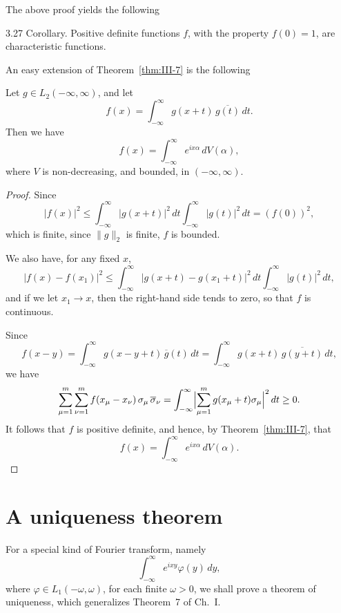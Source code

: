 The above proof yields the following

\begin{nstmt}{3.27}\label{eq:III-3.27}
Corollary. Positive definite functions $f$, with the property $f(0)=1$, are characteristic functions.
\end{nstmt}

An easy extension of Theorem~\ref{thm:III-7} is the following

\begin{theorem}[Bochner]\label{thm:III-9}
Let $g\in L_{2}(-\infty,\infty)$, and let
\begin{equation}\tag{3.28}\label{eq:III-3.28}
f(x)=\int_{-\infty}^{\infty}g(x+t)\,\overline{g(t)}\,dt.
\end{equation}
Then we have
\[
f(x)=\int_{-\infty}^{\infty}e^{ix\alpha}\,dV(\alpha),
\]
where $V$ is non-decreasing, and bounded, in $(-\infty,\infty)$.
\end{theorem}

\begin{proof}
Since
\[
|f(x)|^{2}\le\int_{-\infty}^{\infty}|g(x+t)|^{2}\,dt\int_{-\infty}^{\infty}|g(t)|^{2}\,dt=(f(0))^{2},
\]
which is finite, since $\|g\|_{2}$ is finite, $f$ is bounded.

We also have, for any fixed $x$,
\[
|f(x)-f(x_{1})|^{2}\le\int_{-\infty}^{\infty}|g(x+t)-g(x_{1}+t)|^{2}\,dt\int_{-\infty}^{\infty}|g(t)|^{2}\,dt,
\]
and if we let $x_{1}\to x$, then the right-hand side tends to zero, so that $f$ is continuous.

Since
\[
f(x-y)=\int_{-\infty}^{\infty}g(x-y+t)\,\overline{g}(t)\,dt
=\int_{-\infty}^{\infty}g(x+t)\,\overline{g(y+t)}\,dt,
\]
we have
\[
\sum_{\mu=1}^{m}\sum_{\nu=1}^{m}f(x_{\mu}-x_{\nu})\,\sigma_{\mu}\,\overline{\sigma}_{\nu}
=\int_{-\infty}^{\infty}\Bigl|\sum_{\mu=1}^{m}g(x_{\mu}+t)\sigma_{\mu}\Bigr|^{2}\,dt\ge0.
\]
It follows that $f$ is positive definite, and hence, by Theorem~\ref{thm:III-7}, that
\[
f(x)=\int_{-\infty}^{\infty}e^{ix\alpha}\,dV(\alpha).
\]
\end{proof}

\section{A uniqueness theorem}
\label{sec:III-4}

For a special kind of Fourier transform, namely
\[
\int_{-\infty}^{\infty}e^{ixy}\varphi(y)\,dy,
\]
where $\varphi\in L_{1}(-\omega,\omega)$, for each finite $\omega>0$, we shall prove a theorem of uniqueness, which generalizes Theorem~7 of Ch.~I.

